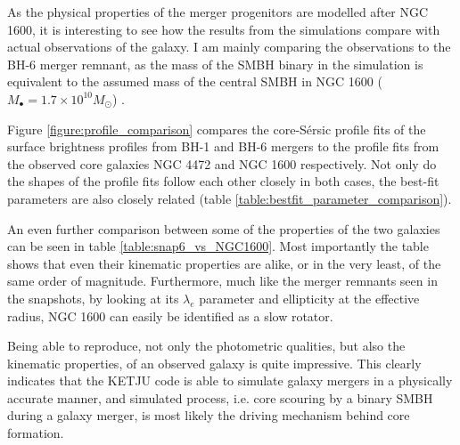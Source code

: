 \documentclass[english, oneside]{HYgradu}
\begin{document}
As the physical properties of the merger progenitors are modelled after NGC 1600, it is interesting to see how the results from the simulations compare with actual observations of the galaxy. I am mainly comparing the observations to the BH-6 merger remnant, as the mass of the SMBH binary in the simulation is equivalent to the assumed mass of the central SMBH in NGC 1600 ($M_\bullet = 1.7 \times 10^{10} M_\odot$) \citep{Thomas2016}.


Figure \ref{figure:profile_comparison} compares the core-Sérsic profile fits of the surface brightness profiles from BH-1 and BH-6 mergers to the profile fits from the observed core galaxies NGC 4472 and NGC 1600 respectively. Not only do the shapes of the profile fits follow each other closely in both cases, the best-fit parameters are also closely related (table \ref{table:bestfit_parameter_comparison}). 

An even further comparison between some of the properties of the two galaxies can be seen in table \ref{table:snap6_vs_NGC1600}. Most importantly the table shows that even their kinematic properties are alike, or in the very least, of the same order of magnitude. Furthermore, much like the merger remnants seen in the snapshots, by looking at its $\lambda_e$ parameter and ellipticity at the effective radius, NGC 1600 can easily be identified as a slow rotator.

Being able to reproduce, not only the photometric qualities, but also the kinematic properties, of an observed galaxy is quite impressive. This clearly indicates that the KETJU code is able to simulate galaxy mergers in a physically accurate manner, and simulated process, i.e. core scouring by a binary SMBH during a galaxy merger,  is most likely the driving mechanism behind core formation.
\end{document}
